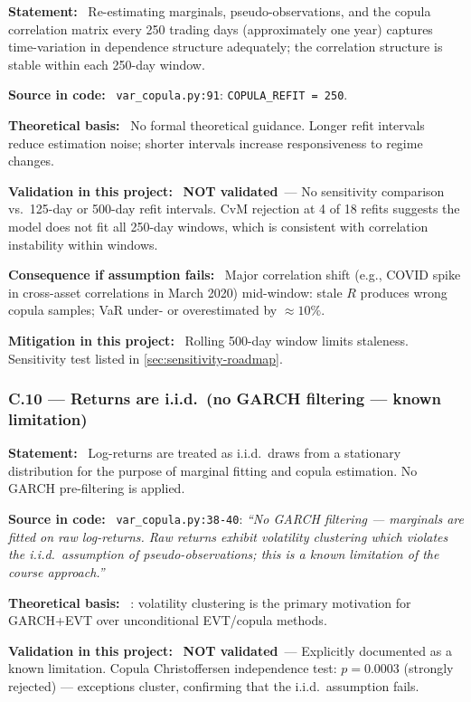 \documentclass[11pt,a4paper]{article}
\newcommand{\asmfield}[1]{\medskip\noindent\textbf{#1:}\ }
\newcommand{\code}[1]{\texttt{#1}}
\newcommand{\notvalidated}{\textbf{NOT validated}}
\begin{document}
\asmfield{Statement}
Re-estimating marginals, pseudo-observations, and the copula correlation
matrix every 250 trading days (approximately one year) captures
time-variation in dependence structure adequately; the correlation structure
is stable within each 250-day window.

\asmfield{Source in code}
\code{var\_copula.py:91}: \lstinline|COPULA_REFIT = 250|.

\asmfield{Theoretical basis}
No formal theoretical guidance. Longer refit intervals reduce estimation
noise; shorter intervals increase responsiveness to regime changes.

\asmfield{Validation in this project}
\notvalidated\ --- No sensitivity comparison vs.\ 125-day or 500-day refit
intervals. CvM rejection at 4 of 18 refits suggests the model does not fit
all 250-day windows, which is consistent with correlation instability
within windows.

\asmfield{Consequence if assumption fails}
Major correlation shift (e.g., COVID spike in cross-asset correlations in
March 2020) mid-window: stale $R$ produces wrong copula samples; VaR
under- or overestimated by $\approx 10\%$.

\asmfield{Mitigation in this project}
Rolling 500-day window limits staleness. Sensitivity test listed in
\cref{sec:sensitivity-roadmap}.

\subsubsection{C.10 --- Returns are i.i.d.\ (no GARCH filtering --- known limitation)}\label{asm:C10}

\asmfield{Statement}
Log-returns are treated as i.i.d.\ draws from a stationary distribution
for the purpose of marginal fitting and copula estimation. No GARCH
pre-filtering is applied.

\asmfield{Source in code}
\code{var\_copula.py:38-40}: \emph{``No GARCH filtering --- marginals are
fitted on raw log-returns. Raw returns exhibit volatility clustering which
violates the i.i.d.\ assumption of pseudo-observations; this is a known
limitation of the course approach.''}

\asmfield{Theoretical basis}
\cite{McNeilFrey2000}: volatility clustering is the primary motivation for
GARCH+EVT over unconditional EVT/copula methods.

\asmfield{Validation in this project}
\notvalidated\ --- Explicitly documented as a known limitation. Copula
Christoffersen independence test: $p = 0.0003$ (strongly rejected) ---
exceptions cluster, confirming that the i.i.d.\ assumption fails.
\end{document}
